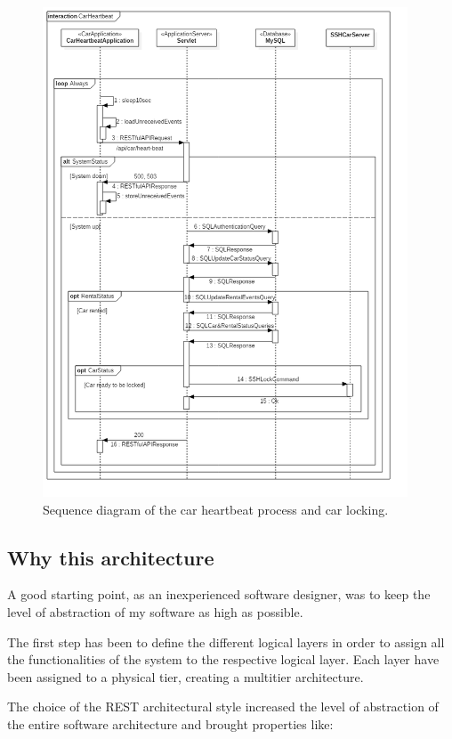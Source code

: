 \begin{figure}[H]
	\noindent
    	\centering
    	\includegraphics[height=550px, keepaspectratio]{diagrams/SequenceCarHeartbeat.png}
	\caption{Sequence diagram of the car heartbeat process and car locking.}
    	\label{fig:sequence-heartbeat}
\end{figure}

\subsection{Why this architecture}

A good starting point, as an inexperienced software designer, was to keep the level of abstraction of my software as high as possible. 

The first step has been to define the different logical layers in order to assign all the functionalities of the system to the respective logical layer. Each layer have been assigned to a physical tier, creating a multitier architecture.

The choice of the REST architectural style increased the level of abstraction of the entire software architecture and brought properties like:

